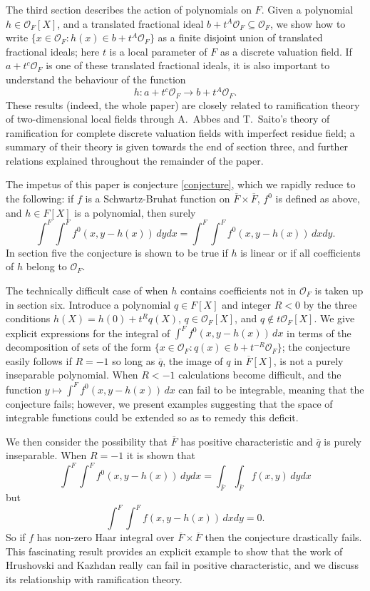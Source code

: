 \documentclass{lmsMODIFIED}
\newcommand{\roi}{\mathcal{O}}
\newcommand{\res}[1]{\overline{#1}}
\begin{document}
The third section describes the action of polynomials on $F$. Given a polynomial $h\in\roi_{F}[X]$, and a translated fractional ideal $b+t^A\roi_{F}\subseteq\roi_{F}$, we show how to write $\{x\in\roi_{F}:h(x)\in b+t^A\roi_{F}\}$ as a finite disjoint union of translated fractional ideals; here $t$ is a local parameter of $F$ as a discrete valuation field. If $a+t^c\roi_{F}$ is one of these translated fractional ideals, it is also important to understand the behaviour of the function \[h:a+t^c\roi_{F}\to b+t^A\roi_{F}.\] These results (indeed, the whole paper) are closely related to ramification theory of two-dimensional local fields through A.~Abbes and T.~Saito's theory of ramification for complete discrete valuation fields with imperfect residue field; a summary of their theory is given towards the end of section three, and further relations explained throughout the remainder of the paper.

The impetus of this paper is conjecture \ref{conjecture}, which we rapidly reduce to the following: if $f$ is a Schwartz-Bruhat function on $\res{F}\times\res{F}$, $f^0$ is defined as above, and $h\in F[X]$ is a polynomial, then surely \[\int^F\int^F f^0(x,y-h(x))\,dydx=\int^F\int^F f^0(x,y-h(x))\,dxdy.\] In section five the conjecture is shown to be true if $h$ is linear or if all coefficients of $h$ belong to $\roi_{F}$.

The technically difficult case of when $h$ contains coefficients not in $\roi_{F}$ is taken up in section six. Introduce a polynomial $q\in F[X]$ and integer $R<0$ by the three conditions $h(X)=h(0)+t^Rq(X)$, $q\in\roi_{F}[X]$, and $q\notin t\roi_{F}[X]$. We give explicit expressions for the integral of $\int^F f^0(x,y-h(x))\,dx$ in terms of the decomposition of sets of the form $\{x\in\roi_{F}:q(x)\in b+t^{-R}\roi_{F}\}$; the conjecture easily follows if $R=-1$ so long as $\res{q}$, the image of $q$ in $\res{F}[X]$, is not a purely inseparable polynomial. When $R<-1$ calculations become difficult, and the function $y\mapsto\int^F f^0(x,y-h(x))\,dx$ can fail to be integrable, meaning that the conjecture fails; however, we present examples suggesting that the space of integrable functions could be extended so as to remedy this deficit.

We then consider the possibility that $\res{F}$ has positive characteristic and $\res{q}$ is purely inseparable. When $R=-1$ it is shown that \[\int^F\int^F f^0(x,y-h(x))\,dydx=\int_{\res{F}}\int_{\res{F}} f(x,y)\,dydx\] but \[\int^F\int^F f(x,y-h(x))\,dxdy=0.\] So if $f$ has non-zero Haar integral over $\res{F}\times\res{F}$ then the conjecture drastically fails. This fascinating result provides an explicit example to show that the work of Hrushovski and Kazhdan really can fail in positive characteristic, and we discuss its relationship with ramification theory.
\end{document}
